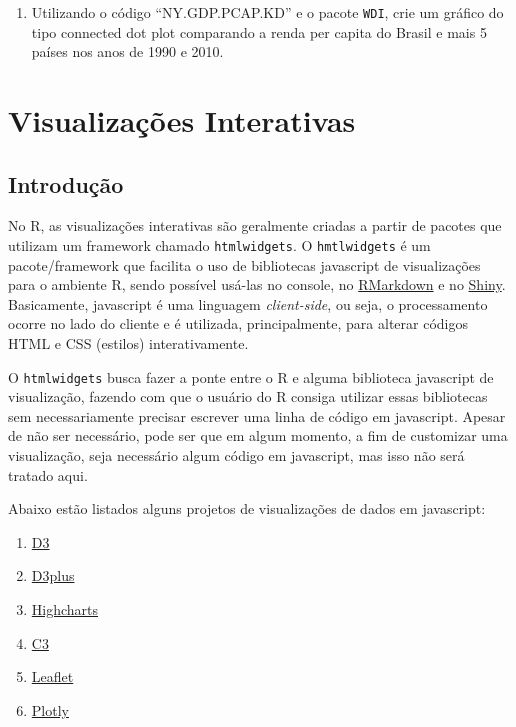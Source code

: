 \documentclass[]{book}
\providecommand{\tightlist}{%
  \setlength{\itemsep}{0pt}\setlength{\parskip}{0pt}}
\begin{document}
\begin{enumerate}
\def\labelenumi{\arabic{enumi}.}
\setcounter{enumi}{6}
\tightlist
\item
  Utilizando o código ``NY.GDP.PCAP.KD'' e o pacote \texttt{WDI}, crie
  um gráfico do tipo connected dot plot comparando a renda per capita do
  Brasil e mais 5 países nos anos de 1990 e 2010.
\end{enumerate}

\chapter{Visualizações Interativas}\label{htmlwidgets}

\section{Introdução}\label{introducao-1}

No R, as visualizações interativas são geralmente criadas a partir de
pacotes que utilizam um framework chamado \texttt{htmlwidgets}. O
\texttt{hmtlwidgets} é um pacote/framework que facilita o uso de
bibliotecas javascript de visualizações para o ambiente R, sendo
possível usá-las no console, no
\href{http://rmarkdown.rstudio.com/}{RMarkdown} e no
\href{http://shiny.rstudio.com/}{Shiny}. Basicamente, javascript é uma
linguagem \emph{client-side}, ou seja, o processamento ocorre no lado do
cliente e é utilizada, principalmente, para alterar códigos HTML e CSS
(estilos) interativamente.

O \texttt{htmlwidgets} busca fazer a ponte entre o R e alguma biblioteca
javascript de visualização, fazendo com que o usuário do R consiga
utilizar essas bibliotecas sem necessariamente precisar escrever uma
linha de código em javascript. Apesar de não ser necessário, pode ser
que em algum momento, a fim de customizar uma visualização, seja
necessário algum código em javascript, mas isso não será tratado aqui.

Abaixo estão listados alguns projetos de visualizações de dados em
javascript:

\begin{enumerate}
\def\labelenumi{\arabic{enumi}.}
\tightlist
\item
  \href{https://d3js.org/}{D3}
\item
  \href{https://d3plus.org/}{D3plus}
\item
  \href{http://www.highcharts.com/}{Highcharts}
\item
  \href{http://c3js.org/}{C3}
\item
  \href{http://leafletjs.com/}{Leaflet}
\item
  \href{https://plot.ly}{Plotly}
\end{enumerate}
\end{document}

